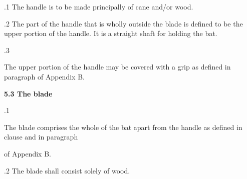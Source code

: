 \documentclass[12pt]{article}
\begin{document}
\vspace{\baselineskip}
{\fontsize{9pt}{10.8pt}.1 \tabto{0.49in} The handle is to be made principally of cane and/or wood.\par}\par


\vspace{\baselineskip}
\begin{adjustwidth}{0.5in}{0.06in}
{\fontsize{9pt}{10.8pt}.2 \tabto{0.49in} The part of the handle that is wholly outside the blade is defined to be the upper portion of the handle. It is a straight shaft for holding the bat.\par}\par

\end{adjustwidth}


\vspace{\baselineskip}
{\fontsize{9pt}{10.8pt}.3 \tabto{0.49in} {\fontsize{8pt}{9.6pt}\selectfont The upper portion of the handle may be covered with a grip as defined in paragraph of Appendix B.\par}\par}\par


\vspace{\baselineskip}
{\fontsize{11pt}{13.2pt}\selectfont \textbf{5.3 \tabto{0.47in} The blade}\par}\par


\vspace{\baselineskip}
{\fontsize{9pt}{10.8pt}.1 \tabto{0.49in} {\fontsize{8pt}{9.6pt}\selectfont The blade comprises the whole of the bat apart from the handle as defined in clause and in paragraph\par}\par}\par


\vspace{\baselineskip}
\begin{adjustwidth}{0.5in}{0.0in}
{\fontsize{9pt}{10.8pt} of Appendix B.\par}\par

\end{adjustwidth}


\vspace{\baselineskip}
{\fontsize{9pt}{10.8pt}.2 \tabto{0.49in} The blade shall consist solely of wood.\par}\par
\end{document}

